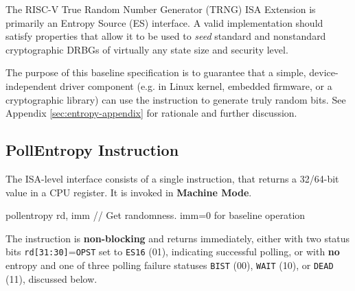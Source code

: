 \label{sec:entropy-source}

    The RISC-V True Random Number Generator (TRNG) ISA Extension is primarily
    an Entropy Source (ES) interface. A valid implementation should satisfy
    properties that allow it to be used to \emph{seed} standard and
    nonstandard cryptographic DRBGs of virtually any state size and security
    level.

    The purpose of this baseline specification is to guarantee that a simple,
    device-independent driver component (e.g. in Linux kernel, embedded
    firmware, or a cryptographic library) can use the instruction to
    generate truly random bits. See Appendix \ref{sec:entropy-appendix} for
    rationale and further discussion.

\subsection{PollEntropy Instruction}
\label{sec:es-pollentropy}


    The ISA-level interface consists of a single instruction,
     that returns a 32/64-bit value in a CPU register.
    It is invoked in {\bf Machine Mode}.

\begin{cryptoisa}
pollentropy      rd, imm          // Get randomness. imm=0 for baseline operation
\end{cryptoisa}


    The instruction is {\bf non-blocking} and returns immediately, either
    with two status bits \verb|rd[31:30]|=\verb|OPST| set to
    \verb|ES16| (01), indicating successful polling, or with {\bf no}
    entropy and one of three polling failure statuses \verb|BIST| (00),
    \verb|WAIT| (10), or \verb|DEAD| (11), discussed below.

